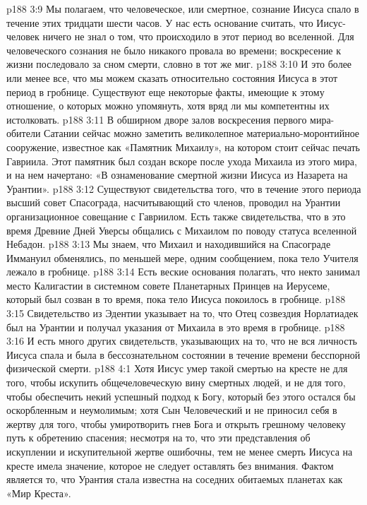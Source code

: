 \vs p188 3:9 \bibnobreakspace Мы полагаем, что человеческое, или смертное, сознание Иисуса спало в течение этих тридцати шести часов. У нас есть основание считать, что Иисус\hyp{}человек ничего не знал о том, что происходило в этот период во вселенной. Для человеческого сознания не было никакого провала во времени; воскресение к жизни последовало за сном смерти, словно в тот же миг.
\vs p188 3:10 \pc И это более или менее все, что мы можем сказать относительно состояния Иисуса в этот период в гробнице. Существуют еще некоторые факты, имеющие к этому отношение, о которых можно упомянуть, хотя вряд ли мы компетентны их истолковать.
\vs p188 3:11 В обширном дворе залов воскресения первого мира\hyp{}обители Сатании сейчас можно заметить великолепное материально\hyp{}моронтийное сооружение, известное как «Памятник Михаилу», на котором стоит сейчас печать Гавриила. Этот памятник был создан вскоре после ухода Михаила из этого мира, и на нем начертано: «В ознаменование смертной жизни Иисуса из Назарета на Урантии».
\vs p188 3:12 Существуют свидетельства того, что в течение этого периода высший совет Спасограда, насчитывающий сто членов, проводил на Урантии организационное совещание с Гавриилом. Есть также свидетельства, что в это время Древние Дней Уверсы общались с Михаилом по поводу статуса вселенной Небадон.
\vs p188 3:13 Мы знаем, что Михаил и находившийся на Спасограде Иммануил обменялись, по меньшей мере, одним сообщением, пока тело Учителя лежало в гробнице.
\vs p188 3:14 Есть веские основания полагать, что некто занимал место Калигастии в системном совете Планетарных Принцев на Иерусеме, который был созван в то время, пока тело Иисуса покоилось в гробнице.
\vs p188 3:15 Свидетельство из Эдентии указывает на то, что Отец созвездия Норлатиадек был на Урантии и получал указания от Михаила в это время в гробнице.
\vs p188 3:16 И есть много других свидетельств, указывающих на то, что не вся личность Иисуса спала и была в бессознательном состоянии в течение времени бесспорной физической смерти.
\vs p188 4:1 Хотя Иисус умер такой смертью на кресте не для того, чтобы искупить общечеловеческую вину смертных людей, и не для того, чтобы обеспечить некий успешный подход к Богу, который без этого остался бы оскорбленным и неумолимым; хотя Сын Человеческий и не приносил себя в жертву для того, чтобы умиротворить гнев Бога и открыть грешному человеку путь к обретению спасения; несмотря на то, что эти представления об искуплении и искупительной жертве ошибочны, тем не менее смерть Иисуса на кресте имела значение, которое не следует оставлять без внимания. Фактом является то, что Урантия стала известна на соседних обитаемых планетах как «Мир Креста».
